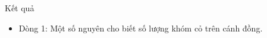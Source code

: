 Kết quả
\begin{itemize}
	\item     Dòng 1: Một số nguyên cho biết số lượng khóm cỏ trên cánh đồng.   
\end{itemize}